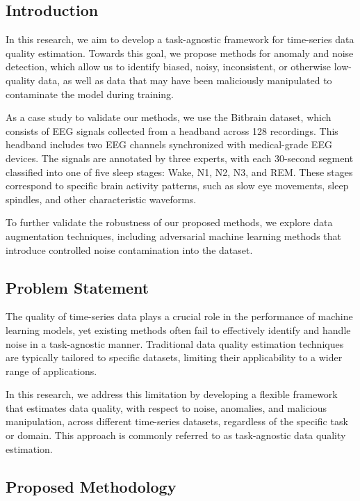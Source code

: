 
\subsection{Introduction}

In this research, we aim to develop a task-agnostic framework for time-series data quality estimation. Towards this goal, we propose methods for anomaly and noise detection, which allow us to identify biased, noisy, inconsistent, or otherwise low-quality data, as well as data that may have been maliciously manipulated to contaminate the model during training.

As a case study to validate our methods, we use the Bitbrain dataset, which consists of EEG signals collected from a headband across 128 recordings. This headband includes two EEG channels synchronized with medical-grade EEG devices. The signals are annotated by three experts, with each 30-second segment classified into one of five sleep stages: Wake, N1, N2, N3, and REM. These stages correspond to specific brain activity patterns, such as slow eye movements, sleep spindles, and other characteristic waveforms.

To further validate the robustness of our proposed methods, we explore data augmentation techniques, including adversarial machine learning methods that introduce controlled noise contamination into the dataset.

\subsection{Problem Statement}

The quality of time-series data plays a crucial role in the performance of machine learning models, yet existing methods often fail to effectively identify and handle noise in a task-agnostic manner. Traditional data quality estimation techniques are typically tailored to specific datasets, limiting their applicability to a wider range of applications. 

In this research, we address this limitation by developing a flexible framework that estimates data quality, with respect to noise, anomalies, and malicious manipulation, across different time-series datasets, regardless of the specific task or domain. This approach is commonly referred to as task-agnostic data quality estimation.

\subsection{Proposed Methodology}

